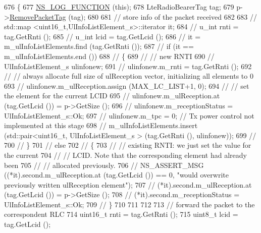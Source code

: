 \begin{DoxyCode}
676 \{
677   \hyperlink{log-macros-disabled_8h_a90b90d5bad1f39cb1b64923ea94c0761}{NS\_LOG\_FUNCTION} (\textcolor{keyword}{this});
678   LteRadioBearerTag tag;
679   p->\hyperlink{classns3_1_1Packet_a078fe922d976a417ab25ba2f3c2fd667}{RemovePacketTag} (tag);
680 
681   \textcolor{comment}{// store info of the packet received}
682 
683 \textcolor{comment}{//   std::map <uint16\_t,UlInfoListElement\_s>::iterator it;}
684 \textcolor{comment}{//   u\_int rnti = tag.GetRnti ();}
685 \textcolor{comment}{//  u\_int lcid = tag.GetLcid ();}
686 \textcolor{comment}{//   it = m\_ulInfoListElements.find (tag.GetRnti ());}
687 \textcolor{comment}{//   if (it == m\_ulInfoListElements.end ())}
688 \textcolor{comment}{//     \{}
689 \textcolor{comment}{//       // new RNTI}
690 \textcolor{comment}{//       UlInfoListElement\_s ulinfonew;}
691 \textcolor{comment}{//       ulinfonew.m\_rnti = tag.GetRnti ();}
692 \textcolor{comment}{//       // always allocate full size of ulReception vector, initializing all elements to 0}
693 \textcolor{comment}{//       ulinfonew.m\_ulReception.assign (MAX\_LC\_LIST+1, 0);}
694 \textcolor{comment}{//       // set the element for the current LCID}
695 \textcolor{comment}{//       ulinfonew.m\_ulReception.at (tag.GetLcid ()) = p->GetSize ();}
696 \textcolor{comment}{//       ulinfonew.m\_receptionStatus = UlInfoListElement\_s::Ok;}
697 \textcolor{comment}{//       ulinfonew.m\_tpc = 0; // Tx power control not implemented at this stage}
698 \textcolor{comment}{//       m\_ulInfoListElements.insert (std::pair<uint16\_t, UlInfoListElement\_s > (tag.GetRnti (),
       ulinfonew));}
699 \textcolor{comment}{// }
700 \textcolor{comment}{//     \}}
701 \textcolor{comment}{//   else}
702 \textcolor{comment}{//     \{}
703 \textcolor{comment}{//       // existing RNTI: we just set the value for the current}
704 \textcolor{comment}{//       // LCID. Note that the corresponding element had already been}
705 \textcolor{comment}{//       // allocated previously.}
706 \textcolor{comment}{//       NS\_ASSERT\_MSG ((*it).second.m\_ulReception.at (tag.GetLcid ()) == 0, "would overwrite previously
       written ulReception element");}
707 \textcolor{comment}{//       (*it).second.m\_ulReception.at (tag.GetLcid ()) = p->GetSize ();}
708 \textcolor{comment}{//       (*it).second.m\_receptionStatus = UlInfoListElement\_s::Ok;}
709 \textcolor{comment}{//     \}}
710 
711 
712 
713   \textcolor{comment}{// forward the packet to the correspondent RLC}
714   uint16\_t rnti = tag.GetRnti ();
715   uint8\_t lcid = tag.GetLcid ();

\end{DoxyCode}
